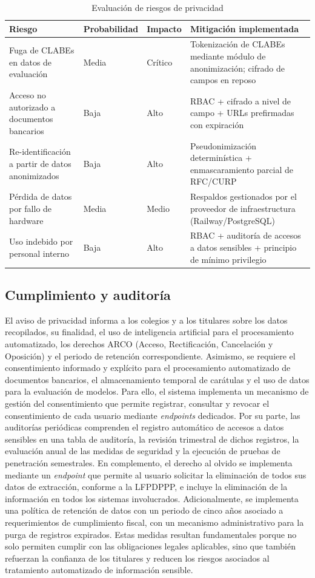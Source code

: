 \begin{table}[H]
\centering
\begin{tabular}{p{3.5cm} l l p{7cm}}
\toprule
\textbf{Riesgo} & \textbf{Probabilidad} & \textbf{Impacto} & \textbf{Mitigación implementada} \\
\midrule
Fuga de CLABEs en datos de evaluación & Media & Crítico & Tokenización de CLABEs mediante módulo de anonimización; cifrado de campos en reposo \\
Acceso no autorizado a documentos bancarios & Baja & Alto & RBAC + cifrado a nivel de campo + URLs prefirmadas con expiración \\
Re-identificación a partir de datos anonimizados & Baja & Alto & Pseudonimización determinística + enmascaramiento parcial de RFC/CURP \\
Pérdida de datos por fallo de hardware & Media & Medio & Respaldos gestionados por el proveedor de infraestructura (Railway/PostgreSQL) \\
Uso indebido por personal interno & Baja & Alto & RBAC + auditoría de accesos a datos sensibles + principio de mínimo privilegio \\
\bottomrule
\end{tabular}
\caption{Evaluación de riesgos de privacidad}
\label{tab:riesgos_privacidad}
\end{table}


\subsection{Cumplimiento y auditoría}

El aviso de privacidad informa a los colegios y a los titulares sobre los datos recopilados, su finalidad, el uso de inteligencia artificial para el procesamiento automatizado, los derechos ARCO (Acceso, Rectificación, Cancelación y Oposición) y el periodo de retención correspondiente. Asimismo, se requiere el consentimiento informado y explícito para el procesamiento automatizado de documentos bancarios, el almacenamiento temporal de carátulas y el uso de datos para la evaluación de modelos. Para ello, el sistema implementa un mecanismo de gestión del consentimiento que permite registrar, consultar y revocar el consentimiento de cada usuario mediante \textit{endpoints} dedicados. Por su parte, las auditorías periódicas comprenden el registro automático de accesos a datos sensibles en una tabla de auditoría, la revisión trimestral de dichos registros, la evaluación anual de las medidas de seguridad y la ejecución de pruebas de penetración semestrales. En complemento, el derecho al olvido se implementa mediante un \textit{endpoint} que permite al usuario solicitar la eliminación de todos sus datos de extracción, conforme a la LFPDPPP, e incluye la eliminación de la información en todos los sistemas involucrados. Adicionalmente, se implementa una política de retención de datos con un periodo de cinco años asociado a requerimientos de cumplimiento fiscal, con un mecanismo administrativo para la purga de registros expirados. Estas medidas resultan fundamentales porque no solo permiten cumplir con las obligaciones legales aplicables, sino que también refuerzan la confianza de los titulares y reducen los riesgos asociados al tratamiento automatizado de información sensible.


